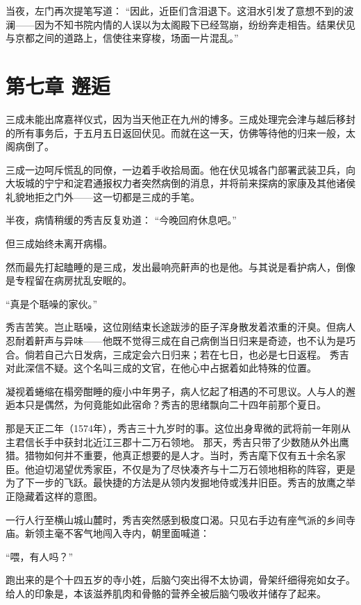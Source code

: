 \documentclass[
]{book}
\begin{document}
当夜，左门再次提笔写道：
``因此，近臣们含泪退下。这泪水引发了意想不到的波澜------因为不知书院内情的人误以为太阁殿下已经驾崩，纷纷奔走相告。结果伏见与京都之间的道路上，信使往来穿梭，场面一片混乱。''

\chapter*{第七章 邂逅}\label{ux7b2cux4e03ux7ae0-ux9082ux9005}

三成未能出席嘉祥仪式，因为当天他正在九州的博多。三成处理完会津与越后移封的所有事务后，于五月五日返回伏见。而就在这一天，仿佛等待他的归来一般，太阁病倒了。

三成一边呵斥慌乱的同僚，一边着手收拾局面。他在伏见城各门部署武装卫兵，向大坂城的宁宁和淀君通报权力者突然病倒的消息，并将前来探病的家康及其他诸侯礼貌地拒之门外------这一切都是三成的手笔。

半夜，病情稍缓的秀吉反复劝道：
``今晚回府休息吧。''

但三成始终未离开病榻。

然而最先打起瞌睡的是三成，发出最响亮鼾声的也是他。与其说是看护病人，倒像是专程留在病房扰乱安眠的。

``真是个聒噪的家伙。''

秀吉苦笑。岂止聒噪，这位刚结束长途跋涉的臣子浑身散发着浓重的汗臭。但病人忍耐着鼾声与异味------他既不觉得三成在自己病倒当日归来是奇迹，也不认为是巧合。倘若自己六日发病，三成定会六日归来；若在七日，也必是七日返程。
秀吉对此深信不疑。这个名叫三成的文官，在他心中占据着如此特殊的位置。

凝视着蜷缩在榻旁酣睡的瘦小中年男子，病人忆起了相遇的不可思议。人与人的邂逅本只是偶然，为何竟能如此宿命？秀吉的思绪飘向二十四年前那个夏日。

那是天正二年（1574年），秀吉三十九岁时的事。这位出身卑微的武将前一年刚从主君信长手中获封北近江三郡十二万石领地。
那天，秀吉只带了少数随从外出鹰猎。猎物如何并不重要，他真正想要的是人才。当时，秀吉麾下仅有五十余名家臣。他迫切渴望优秀家臣，不仅是为了尽快凑齐与十二万石领地相称的阵容，更是为了下一步的飞跃。最快捷的方法是从领内发掘地侍或浅井旧臣。秀吉的放鹰之举正隐藏着这样的意图。

一行人行至横山城山麓时，秀吉突然感到极度口渴。只见右手边有座气派的乡间寺庙。新领主毫不客气地闯入寺内，朝里面喊道：

``喂，有人吗？''

跑出来的是个十四五岁的寺小姓，后脑勺突出得不太协调，骨架纤细得宛如女子。给人的印象是，本该滋养肌肉和骨骼的营养全被后脑勺吸收并储存了起来。
\end{document}
